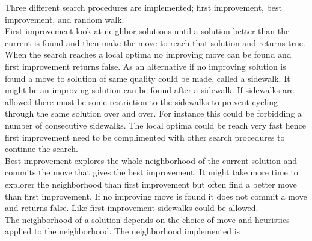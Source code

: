 Three different search procedures are implemented; first improvement, best improvement, and random walk. \\ 
First improvement look at neighbor solutions until a solution better than the current is found  and then make the move to reach that solution and returns true. When the search reaches a local optima no 
improving move can be found and first improvement returns false. As an alternative if no 
improving solution is found a move to solution of same quality could be made, called a sidewalk. It might be an 
improving solution can be found after a sidewalk. If sidewalks are allowed there must be some restriction to the 
sidewalks to prevent cycling through the same solution over and over. For instance this could be forbidding a number of 
consecutive sidewalks. The local optima could be reach very fast hence first improvement need to be complimented with 
other search procedures to continue the search. \\ 
Best improvement explores the whole neighborhood of the current solution and commits the move that gives the best 
improvement. It might take more time to explorer the neighborhood than first improvement but often find a 
better move than first improvement. If no improving move is found it does not commit a move and returns false. Like 
first improvement sidewalks could be allowed. \\ 
The neighborhood of a solution depends on the choice of move and heuristics applied to the neighborhood. The 
neighborhood implemented is  
